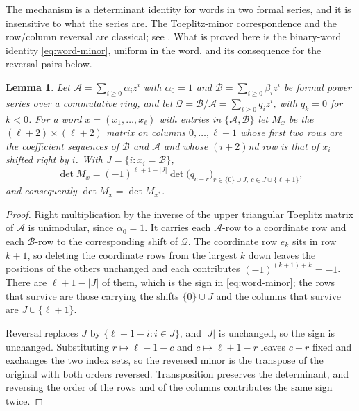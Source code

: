 \documentclass[11pt,a4paper]{amsart}
\numberwithin{equation}{section}
\theoremstyle{plain}
\newtheorem{lemma}[theorem]{Lemma}
\theoremstyle{definition}
\begin{document}
The mechanism is a determinant identity for words in two formal series, and it
is insensitive to what the series are.  The Toeplitz-minor correspondence and
the row/column reversal are classical; see \cite{GarciaGarcia2020ToeplitzMinors}.
What is proved here is the binary-word identity \eqref{eq:word-minor}, uniform
in the word, and its consequence for the reversal pairs below.

\begin{lemma}\label{lem:two-series-reversal}
Let \(\mathcal A=\sum_{i\ge0}\alpha_iz^i\) with \(\alpha_0=1\) and
\(\mathcal B=\sum_{i\ge0}\beta_iz^i\) be formal power series over a commutative
ring, and let \(\mathcal Q=\mathcal B/\mathcal A=\sum_{i\ge0}q_iz^i\), with
\(q_k=0\) for \(k<0\).  For a word \(x=(x_1,\ldots,x_\ell)\) with entries in
\(\{\mathcal A,\mathcal B\}\) let \(M_x\)
be the \((\ell+2)\times(\ell+2)\) matrix on columns \(0,\ldots,\ell+1\) whose first
two rows are the coefficient sequences of \(\mathcal B\) and \(\mathcal A\) and whose
\((i+2)\)nd row is that of \(x_i\) shifted right by \(i\).  With
\(J=\{i:x_i=\mathcal B\}\),
\begin{equation}\label{eq:word-minor}
\det M_x=(-1)^{\ell+1-|J|}\det\bigl(q_{c-r}\bigr)_{r\in\{0\}\cup J,\ c\in J\cup\{\ell+1\}},
\end{equation}
and consequently \(\det M_x=\det M_{x^{*}}\).
\end{lemma}

\begin{proof}
Right multiplication by the inverse of the upper triangular Toeplitz matrix of
\(\mathcal A\) is unimodular, since \(\alpha_0=1\).  It carries each
\(\mathcal A\)-row to a coordinate row and each \(\mathcal B\)-row to the
corresponding shift of \(\mathcal Q\).  The coordinate row \(e_k\) sits in row
\(k+1\), so deleting the coordinate rows from the largest \(k\) down leaves the
positions of the others unchanged and each contributes \((-1)^{(k+1)+k}=-1\).
There are \(\ell+1-|J|\) of them, which is the sign in \eqref{eq:word-minor};
the rows that survive are those carrying the shifts \(\{0\}\cup J\) and the
columns that survive are \(J\cup\{\ell+1\}\).

Reversal replaces \(J\) by \(\{\ell+1-i:i\in J\}\), and \(|J|\) is unchanged, so
the sign is unchanged.  Substituting \(r\mapsto\ell+1-c\) and \(c\mapsto\ell+1-r\)
leaves \(c-r\) fixed and exchanges the two index sets, so the reversed minor is
the transpose of the original with both orders reversed.  Transposition preserves
the determinant, and reversing the order of the rows and of the columns
contributes the same sign twice.
\end{proof}
\end{document}
